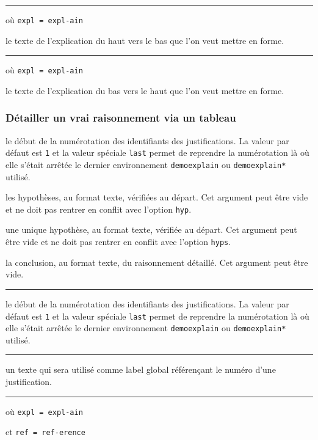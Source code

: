\documentclass[12pt,a4paper]{article}
\newcommand\env[1]{\texttt{#1}}
\theoremstyle{definition}
\newcommand\separation{
	\medskip
	\hfill\rule{0.5\textwidth}{0.75pt}\hfill
	\medskip
}
\newcommand\mwhyprefix[2]{%
	\texttt{#1 = #1-#2}%
}
\begin{document}
\separation


 où \quad \mwhyprefix{expl}{ain}

\IDarg{} le texte de l'explication du haut vers le bas que l'on veut mettre en forme.


\separation


 où \quad \mwhyprefix{expl}{ain}

\IDarg{} le texte de l'explication du bas vers le haut que l'on veut mettre en forme.

\subsubsection{Détailler un \og vrai \fg{} raisonnement via un tableau}


 le début de la numérotation des identifiants des justifications.
              La valeur par défaut est \verb+1+ et la valeur spéciale \verb+last+ permet de reprendre la numérotation là où elle s'était arrêtée le dernier environnement \env{demoexplain} ou \env{demoexplain*} utilisé.

 les hypothèses, au format texte, vérifiées au départ.
             Cet argument peut être vide et ne doit pas rentrer en conflit avec l'option \verb+hyp+.

 une unique hypothèse, au format texte, vérifiée au départ.
            Cet argument peut être vide et ne doit pas rentrer en conflit avec l'option \verb+hyps+.

 la conclusion, au format texte, du raisonnement détaillé.
            Cet argument peut être vide.


\separation



 le début de la numérotation des identifiants des justifications.
              La valeur par défaut est \verb+1+ et la valeur spéciale \verb+last+ permet de reprendre la numérotation là où elle s'était arrêtée le dernier environnement \env{demoexplain} ou \env{demoexplain*} utilisé.


\separation



\IDoption{} un texte qui sera utilisé comme label global référençant le numéro d'une justification.


\separation


 où \quad \mwhyprefix{expl}{ain}
                            et \mwhyprefix{ref}{erence}
\end{document}
